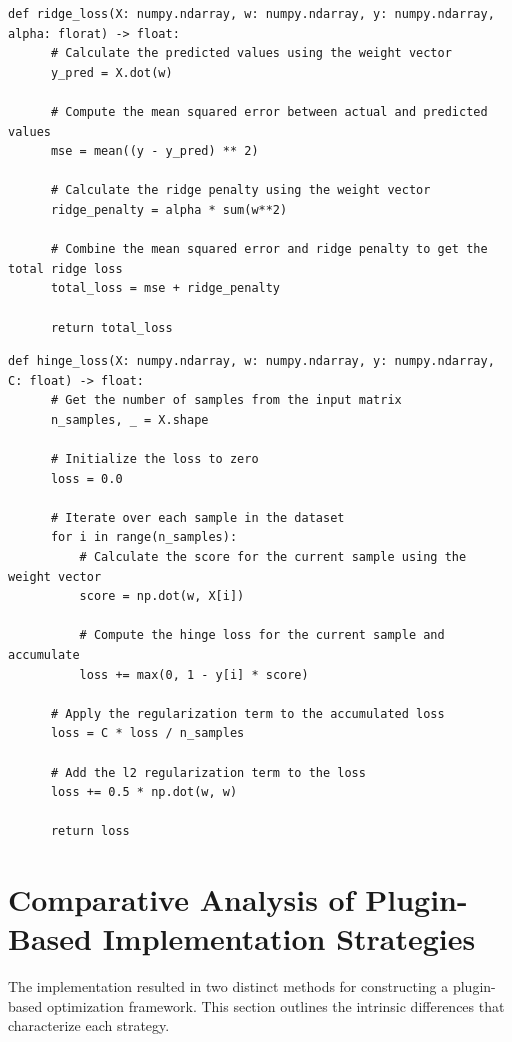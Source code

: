 \documentclass[
  a4paper,  %
  twoside,  %
  bibliography=totoc,
  headsepline,
  cleardoublepage=empty,
  parskip=half,
  draft=false
]{scrbook}
\begin{document}
\begin{lstlisting}[caption={Ridge Loss Calculation}, label=alg:ridge_loss]
  def ridge_loss(X: numpy.ndarray, w: numpy.ndarray, y: numpy.ndarray, alpha: florat) -> float:
      # Calculate the predicted values using the weight vector
      y_pred = X.dot(w)

      # Compute the mean squared error between actual and predicted values
      mse = mean((y - y_pred) ** 2)

      # Calculate the ridge penalty using the weight vector
      ridge_penalty = alpha * sum(w**2)

      # Combine the mean squared error and ridge penalty to get the total ridge loss
      total_loss = mse + ridge_penalty

      return total_loss
\end{lstlisting}

\begin{lstlisting}[caption={Hinge Loss Calculation}, label=alg:hinge_loss]
  def hinge_loss(X: numpy.ndarray, w: numpy.ndarray, y: numpy.ndarray, C: float) -> float:
      # Get the number of samples from the input matrix
      n_samples, _ = X.shape

      # Initialize the loss to zero
      loss = 0.0

      # Iterate over each sample in the dataset
      for i in range(n_samples):
          # Calculate the score for the current sample using the weight vector
          score = np.dot(w, X[i])

          # Compute the hinge loss for the current sample and accumulate
          loss += max(0, 1 - y[i] * score)

      # Apply the regularization term to the accumulated loss
      loss = C * loss / n_samples

      # Add the l2 regularization term to the loss
      loss += 0.5 * np.dot(w, w)

      return loss
\end{lstlisting}

\section{Comparative Analysis of Plugin-Based Implementation Strategies}
\label{sec:differencesBetweenTheTwoPluginBasedImplementationApproaches}

The implementation resulted in two distinct methods for constructing a plugin-based optimization framework.
This section outlines the intrinsic differences that characterize each strategy.
\end{document}
